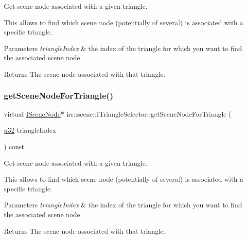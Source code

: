 Get scene node associated with a given triangle. 

This allows to find which scene node (potentially of several) is associated with a specific triangle.


\begin{DoxyParams}{Parameters}
{\em triangle\+Index} & the index of the triangle for which you want to find the associated scene node. \\
\hline
\end{DoxyParams}
\begin{DoxyReturn}{Returns}
The scene node associated with that triangle. 
\end{DoxyReturn}
\mbox{\label{classirr_1_1scene_1_1ITriangleSelector_a9b180f4d9e273a6c1cda9afeb3b1c98b}} 
\subsubsection{\texorpdfstring{get\+Scene\+Node\+For\+Triangle()}{getSceneNodeForTriangle()}\hspace{0.1cm}{\footnotesize\ttfamily [2/2]}}
{\footnotesize\ttfamily virtual \hyperlink{classirr_1_1scene_1_1ISceneNode}{I\+Scene\+Node}$\ast$ irr\+::scene\+::\+I\+Triangle\+Selector\+::get\+Scene\+Node\+For\+Triangle (\begin{DoxyParamCaption}\item[{\hyperlink{namespaceirr_a0416a53257075833e7002efd0a18e804}{u32}}]{triangle\+Index }\end{DoxyParamCaption}) const\hspace{0.3cm}{\ttfamily [pure virtual]}}



Get scene node associated with a given triangle. 

This allows to find which scene node (potentially of several) is associated with a specific triangle.


\begin{DoxyParams}{Parameters}
{\em triangle\+Index} & the index of the triangle for which you want to find the associated scene node. \\
\hline
\end{DoxyParams}
\begin{DoxyReturn}{Returns}
The scene node associated with that triangle. 
\end{DoxyReturn}
\mbox{\label{classirr_1_1scene_1_1ITriangleSelector_a51e15d33c41642441a311a33d2f1ebed}} 
